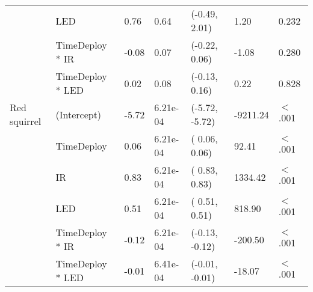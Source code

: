 \begin{table}[ht]
\begin{tabular}{lllllll}
   & LED & 0.76 & 0.64 & (-0.49,  2.01) & 1.20 & 0.232  \\ 
   & TimeDeploy * IR & -0.08 & 0.07 & (-0.22,  0.06) & -1.08 & 0.280  \\ 
   & TimeDeploy * LED & 0.02 & 0.08 & (-0.13,  0.16) & 0.22 & 0.828  \\ 
  Red squirrel & (Intercept) & -5.72 & 6.21e-04 & (-5.72, -5.72) & -9211.24 & $<$ .001 \\ 
   & TimeDeploy & 0.06 & 6.21e-04 & ( 0.06,  0.06) & 92.41 & $<$ .001 \\ 
   & IR & 0.83 & 6.21e-04 & ( 0.83,  0.83) & 1334.42 & $<$ .001 \\ 
   & LED & 0.51 & 6.21e-04 & ( 0.51,  0.51) & 818.90 & $<$ .001 \\ 
   & TimeDeploy * IR & -0.12 & 6.21e-04 & (-0.13, -0.12) & -200.50 & $<$ .001 \\ 
   & TimeDeploy * LED & -0.01 & 6.41e-04 & (-0.01, -0.01) & -18.07 & $<$ .001 \\ 
   \hline
\end{tabular}
\end{table}
